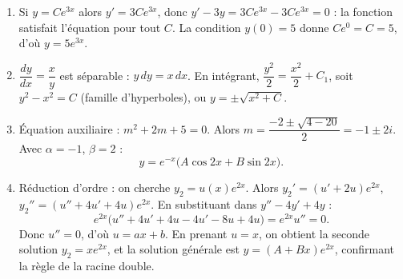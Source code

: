 \documentclass[11pt]{article}
\begin{document}
\begin{corrige}
\begin{enumerate}
\item Si $y = Ce^{3x}$ alors $y' = 3Ce^{3x}$, donc $y' - 3y = 3Ce^{3x} - 3Ce^{3x} = 0$ : la fonction satisfait l'équation pour tout $C$. La condition $y(0) = 5$ donne $Ce^{0} = C = 5$, d'où $\boxed{y = 5e^{3x}}$.
\item $\dfrac{dy}{dx} = \dfrac{x}{y}$ est séparable : $y\,dy = x\,dx$. En intégrant, $\dfrac{y^{2}}{2} = \dfrac{x^{2}}{2} + C_{1}$, soit $\boxed{y^{2} - x^{2} = C}$ (famille d'hyperboles), ou $y = \pm\sqrt{x^{2} + C}$.
\item Équation auxiliaire : $m^{2} + 2m + 5 = 0$. Alors $m = \dfrac{-2 \pm \sqrt{4 - 20}}{2} = -1 \pm 2i$. Avec $\alpha = -1$, $\beta = 2$ :
\[ \boxed{y = e^{-x}\big(A\cos 2x + B\sin 2x\big)}. \]
\item Réduction d'ordre : on cherche $y_{2} = u(x)e^{2x}$. Alors $y_{2}' = (u' + 2u)e^{2x}$, $y_{2}'' = (u'' + 4u' + 4u)e^{2x}$. En substituant dans $y'' - 4y' + 4y$ :
\[ e^{2x}\big(u'' + 4u' + 4u - 4u' - 8u + 4u\big) = e^{2x}u'' = 0. \]
Donc $u'' = 0$, d'où $u = ax + b$. En prenant $u = x$, on obtient la seconde solution $\boxed{y_{2} = xe^{2x}}$, et la solution générale est $y = (A + Bx)e^{2x}$, confirmant la règle de la racine double.
\end{enumerate}
\end{corrige}
\end{document}
